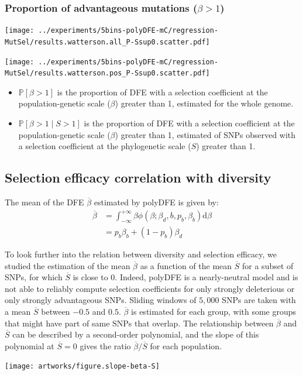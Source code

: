 \documentclass{article}
\newcommand{\der}{\textrm{d}}
\newcommand{\proba}{\mathbb{P}}
\newcommand{\Sphy}{S}
\newcommand{\SphyMean}{\overline{\Sphy}}
\newcommand{\divAdv}{ \Sphy > 1}
\newcommand{\given}{\mid}
\newcommand{\Spop}{\beta}
\newcommand{\SpopMean}{\overline{\Spop}}
\newcommand{\polyAdv}{ \Spop > 1}
\begin{document}
    \subsubsection{Proportion of advantageous mutations ($\polyAdv$)}\label{subsec:proportion-advantageous-mutations}
    \begin{minipage}{0.32\linewidth}
        \texttt{[image: ../experiments/5bins-polyDFE-mC/regression-MutSel/results.watterson.all\_P-Ssup0.scatter.pdf]}
    \end{minipage}
    \begin{minipage}{0.32\linewidth}
        \texttt{[image: ../experiments/5bins-polyDFE-mC/regression-MutSel/results.watterson.pos\_P-Ssup0.scatter.pdf]}
    \end{minipage}
    \begin{itemize}
        \item $ \proba [ \polyAdv ]$ is the proportion of DFE with a selection coefficient at the population-genetic scale ($\Spop$) greater than 1, estimated for the whole genome.
        \item $\proba [ \polyAdv \given \divAdv] $ is the proportion of DFE with a selection coefficient at the population-genetic scale ($\Spop$) greater than 1, estimated of SNPs observed with a selection coefficient at the phylogenetic scale ($\Sphy$) greater than 1.
    \end{itemize}

    \subsection{Selection efficacy correlation with diversity}\label{subsec:selection-efficacy-correlation-with-diversity}
    The mean of the DFE $\SpopMean$ estimated by polyDFE is given by:
    \begin{align*}
        \SpopMean & = \int_{-\infty}^{+\infty} \Spop \phi \left( \Spop; \Spop_d , b, p_b, \Spop_b \right) \der \Spop \\
        & = p_b \Spop_b + \left( 1 - p_b \right) \Spop_d
    \end{align*}

    To look further into the relation between diversity and selection efficacy, we studied the estimation of the mean $\SpopMean$ as a function of the mean $\SphyMean$ for a subset of SNPs, for which $\SphyMean$ is close to $0$.
    Indeed, polyDFE is a nearly-neutral model and is not able to reliably compute selection coefficients for only strongly deleterious or only strongly advantageous SNPs.
    Sliding windows of $5,000$ SNPs are taken with a mean $\SphyMean$ between $-0.5$ and $0.5$.
    $\SpopMean$ is estimated for each group, with some groups that might have part of same SNPs that overlap.
    The relationship between $\SpopMean$ and $\SphyMean$ can be described by a second-order polynomial, and the slope of this polynomial at $\SphyMean=0$ gives the ratio $\SpopMean/\SphyMean$ for each population.
    \begin{center}
        \texttt{[image: artworks/figure.slope-beta-S]}
    \end{center}
\end{document}
